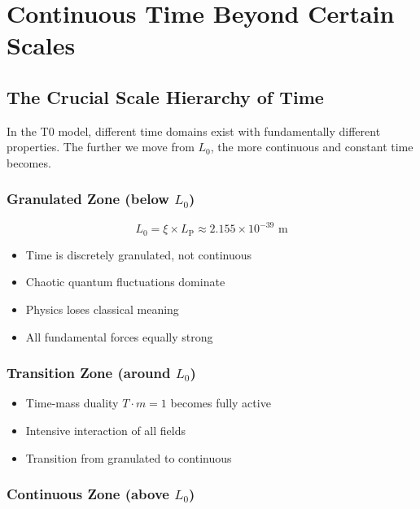 \documentclass[12pt,a4paper]{article}
\newcommand{\xipar}{\xi}
\newcommand{\Lzero}{L_0}
\newcommand{\Lp}{L_{\text{P}}}
\theoremstyle{definition}
\theoremstyle{remark}
\begin{document}
	\section{Continuous Time Beyond Certain Scales}
	
	\subsection{The Crucial Scale Hierarchy of Time}
	
	In the T0 model, different time domains exist with fundamentally different properties. The further we move from $\Lzero$, the more continuous and constant time becomes.
	
	\subsubsection{Granulated Zone (below $\Lzero$)}
	
	\begin{equation}
		\Lzero = \xipar \times \Lp \approx 2.155 \times 10^{-39} \text{ m}
	\end{equation}
	
	\begin{itemize}
		\item Time is discretely granulated, not continuous
		\item Chaotic quantum fluctuations dominate
		\item Physics loses classical meaning
		\item All fundamental forces equally strong
	\end{itemize}
	
	\subsubsection{Transition Zone (around $\Lzero$)}
	
	\begin{itemize}
		\item Time-mass duality $T \cdot m = 1$ becomes fully active
		\item Intensive interaction of all fields
		\item Transition from granulated to continuous
	\end{itemize}
	
	\subsubsection{Continuous Zone (above $\Lzero$)}
	
\end{document}
